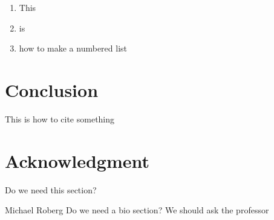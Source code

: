 \begin{enumerate}
    \item This
    \item is
    \item how to make a numbered list
\end{enumerate}


\section{Conclusion}
This is how to cite something \cite{brown}


\section*{Acknowledgment}
Do we need this section?



\ifCLASSOPTIONcaptionsoff
  \newpage
\fi





\begin{IEEEbiography}{Michael Roberg}
Do we need a bio section? We should ask the professor
\end{IEEEbiography}
\vfill
